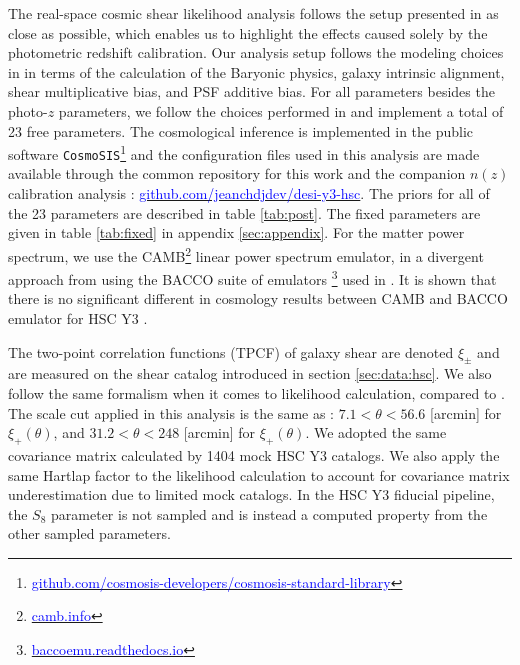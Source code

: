 The real-space cosmic shear likelihood analysis follows the setup presented in \cite{Li2023_HSCY3_CosmicShear} as close as possible, which enables us to highlight the effects caused solely by the photometric redshift calibration. Our analysis setup follows the modeling choices in \cite{Li2023_HSCY3_CosmicShear} in terms of the calculation of the Baryonic physics, galaxy intrinsic alignment, shear multiplicative bias, and PSF additive bias. 
For all parameters besides the photo-$z$ parameters, we follow the choices performed in \cite{Li2023_HSCY3_CosmicShear, Dalal2023CosmoShearHSC} and implement a total of 23 free parameters. The cosmological inference is implemented in the public software \texttt{CosmoSIS}\footnote{\href{https://github.com/cosmosis-developers/cosmosis-standard-library}{\textcolor{blue}{github.com/cosmosis-developers/cosmosis-standard-library}}} and the configuration files used in this analysis are made available through the common repository for this work and the companion $n(z)$ calibration analysis \citep{ChoppinDeJanvry2025a}: \href{https://github.com/JeanCHDJdev/desi-y3-hsc}{\textcolor{blue}{github.com/jeanchdjdev/desi-y3-hsc}}. The priors for all of the 23 parameters are described in table \ref{tab:post}. The fixed parameters are given in table \ref{tab:fixed} in appendix \ref{sec:appendix}.
For the matter power spectrum, we use the CAMB\footnote{\href{https://camb.info/}{\textcolor{blue} {camb.info}}} \cite{LewisCAMB2011} linear power spectrum emulator, in a divergent approach from using the BACCO suite of emulators  \cite{Arico2022BACCOEmulator} \footnote{\href{https://baccoemu.readthedocs.io/en/latest/}{\textcolor{blue}{baccoemu.readthedocs.io}}} used in \cite{Li2023_HSCY3_CosmicShear}. It is shown that there is no significant different in cosmology results between CAMB and BACCO emulator for HSC Y3 \cite{Li2023_HSCY3_CosmicShear}.


The two-point correlation functions (TPCF) of galaxy shear are denoted $\xi_\pm$ \cite{Li2023_HSCY3_CosmicShear} and are measured on the shear catalog introduced in section \ref{sec:data:hsc}.
We also follow the same formalism when it comes to likelihood calculation, compared to \cite{Li2023_HSCY3_CosmicShear}.
The scale cut applied in this analysis is the same as  \cite{Li2023_HSCY3_CosmicShear}: $7.1 < \theta < 56.6$ [arcmin] for $\xi_+(\theta)$, and $31.2 < \theta < 248$ [arcmin] for $\xi_+(\theta)$. We adopted the same covariance matrix calculated by 1404 mock HSC Y3 catalogs. We also apply the same Hartlap factor \cite{Hartlap2008} to the likelihood calculation to account for covariance matrix underestimation due to limited mock catalogs. In the HSC Y3 fiducial pipeline, the $S_8$ parameter is not sampled and is instead a computed property from the other sampled parameters. 

